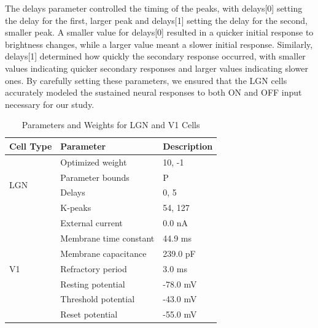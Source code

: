 \documentclass[12pt]{article}
\begin{document}
The delays parameter controlled the timing of the peaks, with delays[0] setting the delay for the first, larger peak and delays[1] setting the delay for the second, smaller peak. A smaller value for delays[0] resulted in a quicker initial response to brightness changes, while a larger value meant a slower initial response. Similarly, delays[1] determined how quickly the secondary response occurred, with smaller values indicating quicker secondary responses and larger values indicating slower ones. By carefully setting these parameters, we ensured that the LGN cells accurately modeled the sustained neural responses to both ON and OFF input necessary for our study.

\begin{table}[H]
  \centering
  \caption{Parameters and Weights for LGN and V1 Cells}
  \begin{tabular}{lll}
  \toprule
  \textbf{Cell Type} & \textbf{Parameter} & \textbf{Description} \\
  \midrule
  \multirow{4}{*}{LGN} 
      & Optimized weight      & 10, -1 \\
      & Parameter bounds   & P \\
      & Delays   & 0, 5 \\
      & K-peaks   & 54, 127 \\
  \midrule
  \multirow{7}{*}{V1} 
      & External current         & 0.0 nA \\
      & Membrane time constant        & 44.9 ms \\
      & Membrane capacitance          & 239.0 pF \\
      & Refractory period       & 3.0 ms \\
      & Resting potential          & -78.0 mV \\
      & Threshold potential         & -43.0 mV \\
      & Reset potential      & -55.0 mV \\
  \bottomrule
  \end{tabular}
\end{table}
\end{document}
